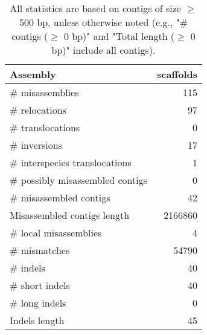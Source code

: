 \documentclass[12pt,a4paper]{article}
\begin{document}
\begin{table}[ht]
\begin{center}
\caption{All statistics are based on contigs of size $\geq$ 500 bp, unless otherwise noted (e.g., "\# contigs ($\geq$ 0 bp)" and "Total length ($\geq$ 0 bp)" include all contigs).}
\begin{tabular}{|l*{1}{|r}|}
\hline
Assembly & scaffolds \\ \hline
\# misassemblies & 115 \\ \hline
\hspace{5mm}\# relocations & 97 \\ \hline
\hspace{5mm}\# translocations & 0 \\ \hline
\hspace{5mm}\# inversions & 17 \\ \hline
\hspace{5mm}\# interspecies translocations & 1 \\ \hline
\# possibly misassembled contigs & 0 \\ \hline
\# misassembled contigs & 42 \\ \hline
Misassembled contigs length & 2166860 \\ \hline
\# local misassemblies & 4 \\ \hline
\# mismatches & 54790 \\ \hline
\# indels & 40 \\ \hline
\hspace{5mm}\# short indels & 40 \\ \hline
\hspace{5mm}\# long indels & 0 \\ \hline
Indels length & 45 \\ \hline
\end{tabular}
\end{center}
\end{table}
\end{document}

